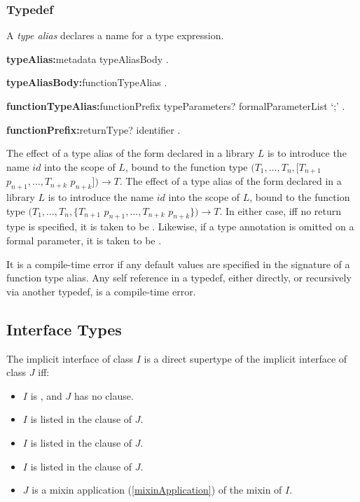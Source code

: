 \documentclass{article}
\begin{document}
\subsubsection{Typedef}

\LMHash{}
A {\em type alias} declares a name for a type expression.

\begin{grammar}
{\bf typeAlias:}metadata \TYPEDEF{} typeAliasBody
  .

{\bf typeAliasBody:}functionTypeAlias
  .

{\bf functionTypeAlias:}functionPrefix typeParameters? formalParameterList `{\escapegrammar ;}'
  .

{\bf functionPrefix:}returnType? identifier
  .
\end{grammar}

\LMHash{}
 The effect of a type alias of the form  declared in a library $L$ is to introduce the name $id$ into the scope of $L$, bound to the function type $(T_1, \ldots, T_n, [T_{n+1}$ $p_{n+1}, \ldots, T_{n+k}$ $p_{n+k}]) \rightarrow T$.
The effect of a type alias of the form  declared in a library $L$ is to introduce the name $id$ into the scope of $L$, bound to the function type $(T_1, \ldots, T_n, \{T_{n+1}$ $p_{n+1}, \ldots, T_{n+k}$ $p_{n+k}\}) \rightarrow T$.
In either case, if{}f no return type is specified, it is taken to be \DYNAMIC{}.
Likewise, if a type annotation is omitted on a formal parameter, it is taken to be \DYNAMIC{}.

\LMHash{}
It is a compile-time error if any default values are specified in the signature of a function type alias.
Any self reference in a typedef, either directly, or recursively via another typedef, is a compile-time error.


\subsection{Interface Types}

\LMHash{}
The implicit interface of class $I$ is a direct supertype of the implicit interface of class $J$ if{}f:
\begin{itemize}
\item $I$ is , and $J$ has no \EXTENDS{} clause.
\item $I$ is listed in the \EXTENDS{} clause of $J$.
\item $I$ is listed in the \IMPLEMENTS{} clause of $J$.
\item $I$ is listed in the \WITH{} clause of $J$.
\item $J$ is a mixin application (\ref{mixinApplication}) of the mixin of $I$.
\end{itemize}
\end{document}
